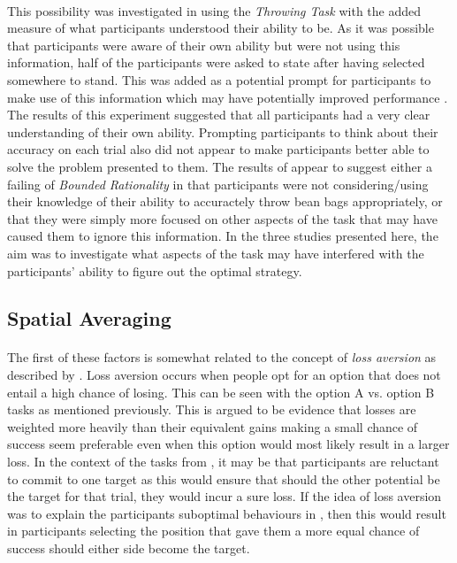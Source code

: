 \documentclass[12pt]{article}
\begin{document}
\paragraph{} This possibility was investigated in \cite{James2017} using the \textit{Throwing Task} with the added measure of what participants understood their ability to be. As it was possible that participants were aware of their own ability but were not using this information, half of the participants were asked to state after having selected somewhere to stand. This was added as a potential prompt for participants to make use of this information which may have potentially improved performance \citep{chang2014self}. The results of this experiment suggested that all participants had a very clear understanding of their own ability. Prompting participants to think about their accuracy on each trial also did not appear to make participants better able to solve the problem presented to them. The results of \cite{James2017} appear to suggest either a failing of \textit{Bounded Rationality} in that participants were not considering/using their knowledge of their ability to accuractely throw bean bags appropriately, or that they were simply more focused on other aspects of the task that may have caused them to ignore this information. In the three studies presented here, the aim was to investigate what aspects of the task may have interfered with the participants' ability to figure out the optimal strategy. 


\subsection*{Spatial Averaging}

\paragraph{} The first of these factors is somewhat related to the concept of \textit{loss aversion} as described by \cite{KahnemanProspect}. Loss aversion occurs when people opt for an option that does not entail a high chance of losing. This can be seen with the option A vs. option B tasks as mentioned previously. This is argued to be evidence that losses are weighted more heavily than their equivalent gains making a small chance of success seem preferable even when this option would most likely result in a larger loss. In the context of the tasks from \cite{clarke2015failure}, it may be that participants are reluctant to commit to one target as this would ensure that should the other potential be the target for that trial, they would incur a sure loss. If the idea of loss aversion was to explain the participants suboptimal behaviours in \cite{clarke2015failure}, then this would result in participants selecting the position that gave them a more equal chance of success should either side become the target. 
\end{document}
